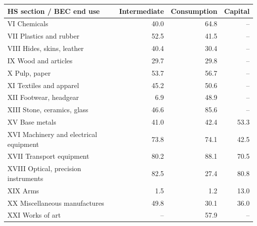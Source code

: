 \begin{tabular}{lrrr}
\toprule
HS section / BEC end use & Intermediate & Consumption & Capital \\
\midrule
VI Chemicals & 40.0 & 64.8 & -- \\
VII Plastics and rubber & 52.5 & 41.5 & -- \\
VIII Hides, skins, leather & 40.4 & 30.4 & -- \\
IX Wood and articles & 29.7 & 29.8 & -- \\
X Pulp, paper & 53.7 & 56.7 & -- \\
XI Textiles and apparel & 45.2 & 50.6 & -- \\
XII Footwear, headgear & 6.9 & 48.9 & -- \\
XIII Stone, ceramics, glass & 46.6 & 85.6 & -- \\
XV Base metals & 41.0 & 42.4 & 53.3 \\
XVI Machinery and electrical equipment & 73.8 & 74.1 & 42.5 \\
XVII Transport equipment & 80.2 & 88.1 & 70.5 \\
XVIII Optical, precision instruments & 82.5 & 27.4 & 80.8 \\
XIX Arms & 1.5 & 1.2 & 13.0 \\
XX Miscellaneous manufactures & 49.8 & 30.1 & 36.0 \\
XXI Works of art & -- & 57.9 & -- \\
\bottomrule
\end{tabular}
